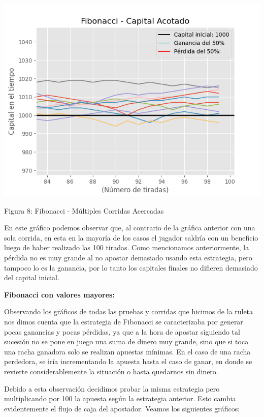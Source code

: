 \documentclass{article}
\begin{document}
\begin{center}
    \includegraphics[width=0.7\linewidth]{FIB-acotado-multiplestiradas(2).png}
    
    \caption{Figura 8: Fibonacci - Múltiples Corridas Acercadas}
\end{center}

En este gráfico podemos observar que, al contrario de la gráfica anterior con una sola corrida, en esta en la mayoría de los casos el jugador saldría con un beneficio luego de haber realizado las 100 tiradas. Como mencionamos anteriormente, la pérdida no es muy grande al no apostar demasiado usando esta estrategia, pero tampoco lo es la ganancia, por lo tanto los capitales finales no difieren demasiado del capital inicial.

\textbf{Fibonacci con valores mayores:}

Observando los gráficos de todas las pruebas y corridas que hicimos de la ruleta nos dimos cuenta que la estrategia de Fibonacci se caracterizaba por generar pocas ganancias y pocas pérdidas, ya que a la hora de apostar siguiendo tal sucesión  no se pone en juego una suma de dinero muy grande, sino que si toca una racha ganadora solo se realizan apuestas mínimas. En el caso de una racha perdedora, se iría incrementando la apuesta hasta el caso de ganar, en donde se revierte considerablemente la situación o hasta quedarnos sin dinero.

Debido a esta observación decidimos probar la misma estrategia pero multiplicando por 100 la apuesta según la estrategia anterior. Esto cambia evidentemente el flujo de caja del apostador. Veamos los siguientes gráficos:
\end{document}
